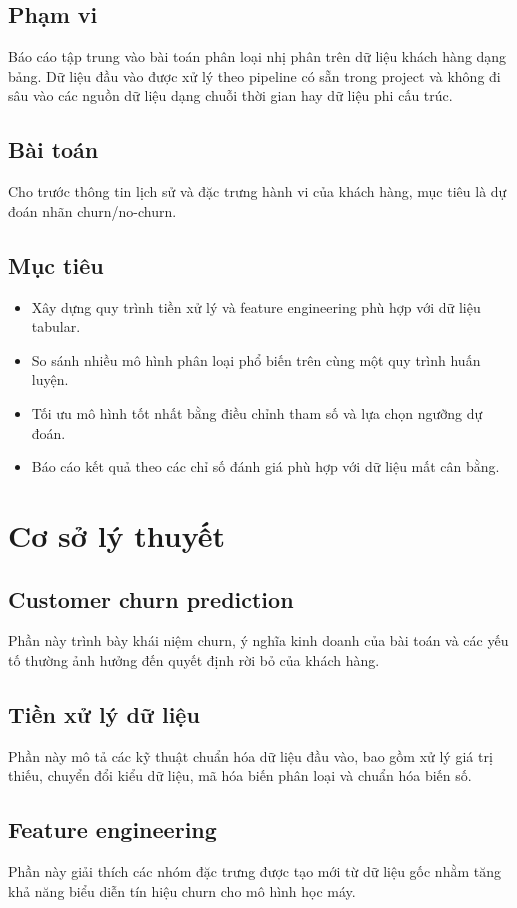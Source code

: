 \documentclass[conference]{IEEEtran}
\begin{document}
\subsection{Phạm vi}
Báo cáo tập trung vào bài toán phân loại nhị phân trên dữ liệu khách hàng dạng bảng. Dữ liệu đầu vào được xử lý theo pipeline có sẵn trong project và không đi sâu vào các nguồn dữ liệu dạng chuỗi thời gian hay dữ liệu phi cấu trúc.

\subsection{Bài toán}
Cho trước thông tin lịch sử và đặc trưng hành vi của khách hàng, mục tiêu là dự đoán nhãn churn/no-churn.

\subsection{Mục tiêu}
\begin{itemize}
    \item Xây dựng quy trình tiền xử lý và feature engineering phù hợp với dữ liệu tabular.
    \item So sánh nhiều mô hình phân loại phổ biến trên cùng một quy trình huấn luyện.
    \item Tối ưu mô hình tốt nhất bằng điều chỉnh tham số và lựa chọn ngưỡng dự đoán.
    \item Báo cáo kết quả theo các chỉ số đánh giá phù hợp với dữ liệu mất cân bằng.
\end{itemize}

\section{Cơ sở lý thuyết}
\subsection{Customer churn prediction}
Phần này trình bày khái niệm churn, ý nghĩa kinh doanh của bài toán và các yếu tố thường ảnh hưởng đến quyết định rời bỏ của khách hàng.

\subsection{Tiền xử lý dữ liệu}
Phần này mô tả các kỹ thuật chuẩn hóa dữ liệu đầu vào, bao gồm xử lý giá trị thiếu, chuyển đổi kiểu dữ liệu, mã hóa biến phân loại và chuẩn hóa biến số.

\subsection{Feature engineering}
Phần này giải thích các nhóm đặc trưng được tạo mới từ dữ liệu gốc nhằm tăng khả năng biểu diễn tín hiệu churn cho mô hình học máy.
\end{document}
